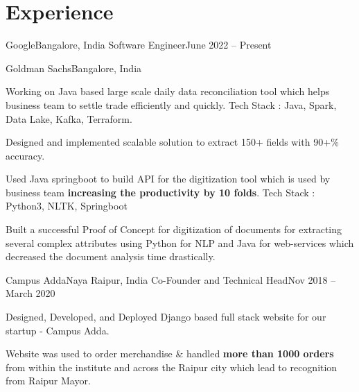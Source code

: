 \section{Experience}
  \resumeSubHeadingListStart
   
    \resumeSubheading
      {Google}{Bangalore, India}
      {Software Engineer}{June 2022 -- Present}
    
    \resumeSubheadingtwo
    {Goldman Sachs}{Bangalore, India}{}{}
    
      \vspace{-4pt}
      
      \resumeItemListStart
      
        \item Working on Java based large scale daily data reconciliation tool which helps business team to settle trade efficiently and quickly.  Tech Stack : Java, Spark, Data Lake, Kafka, Terraform.
        
      \resumeItemListEnd
      
      
      \resumeItemListStart
      
        \item Designed and implemented scalable solution to extract 150+ fields with 90+\% accuracy.
        
        \item Used Java springboot to build API for the digitization tool which is used by business team \textbf{increasing the productivity by 10 folds}. Tech Stack : Python3, NLTK, Springboot
        
      \resumeItemListEnd
      
      \resumeItemListStart
      
        \item Built a successful Proof of Concept for digitization of documents for extracting several complex attributes using Python for NLP and Java for web-services which decreased the document analysis time drastically.
        
        
      \resumeItemListEnd
    
    \resumeSubheading
      {Campus Adda}{Naya Raipur, India}
      {Co-Founder and Technical Head}{Nov 2018 -- March 2020}
      \resumeItemListStart
        
        \item Designed, Developed, and Deployed Django based full stack website for our startup - Campus Adda.
        
        \item Website was used to order merchandise \& handled \textbf{more than 1000 orders} from within the institute and across the Raipur city which lead to recognition from Raipur Mayor.
      
      \resumeItemListEnd
  \resumeSubHeadingListEnd
